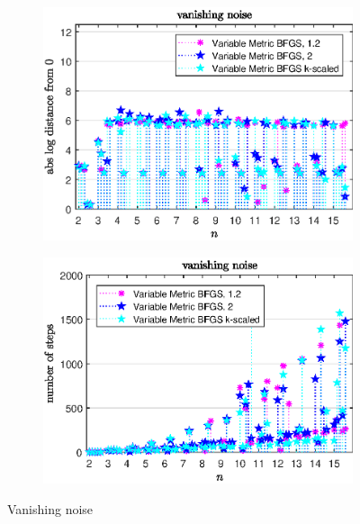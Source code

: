 \begin{figure}[H]
	\begin{subfigure}{0.49\textwidth}
		\includegraphics[width=\textwidth]{Pictures/Plots/vanishing_noise_comp.eps}%
	\end{subfigure}
	\begin{subfigure}{0.49\textwidth}
		\includegraphics[width=\textwidth]{Pictures/Plots/steps_vanishing_noise_comp.eps}%
	\end{subfigure}
	\caption{Vanishing noise}%
	\label{fig_van_noise_comp}%
\end{figure}

